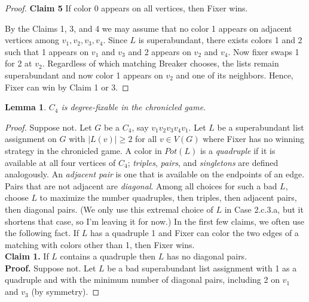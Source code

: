 \documentclass[12pt,reqno]{amsart}
\theoremstyle{plain}
\newtheorem{lem}[thm]{Lemma}
\theoremstyle{definition}
\theoremstyle{remark}
\newcommand{\card}[1]{\left|#1\right|}
\begin{document}
\begin{proof}
\noindent
\textbf{Claim 5}
If color 0 appears on all vertices, then Fixer wins.

By the Claims 1, 3, and 4 we may assume that no color 1 appears on adjacent
vertices among $v_1,v_2,v_3,v_4$.  Since $L$ is superabundant, there exists
colors 1 and 2 such that 1 appears on $v_1$ and $v_3$ and 2 appears on $v_2$
and $v_4$.  Now fixer swaps 1 for 2 at $v_2$.  Regardless of which matching
Breaker chooses, the lists remain superabundant and now color 1 appears on
$v_2$ and one of its neighbors.  Hence, Fixer can win by Claim 1 or 3.
\end{proof}


\begin{lem}\label{FixC4}
$C_4$ is degree-fixable in the chronicled game.
\end{lem}
\begin{proof}
Suppose not. Let $G$ be a $C_4$, say $v_1v_2v_3v_4v_1$.  Let $L$ be a superabundant list assignment on $G$ with $\card{L(v)} \ge 2$ for all $v \in V(G)$ where Fixer has no winning strategy in the chronicled game.
A color in $Pot(L)$ is a \emph{quadruple} if it is available at all four
vertices of $C_4$; \emph{triples}, \emph{pairs}, and \emph{singletons} are
defined analogously.  An \emph{adjacent pair} is one that is available on the
endpoints of an edge.  Pairs that are not adjacent are \emph{diagonal}.
Among all choices for such a bad $L$, choose $L$ to maximize the number
quadruples, then triples, then adjacent pairs, then diagonal pairs.
(We only use this extremal choice of $L$ in Case 2.c.3.a, but it shortens that
case, so I'm leaving it for now.)
In the first few claims, we often use the following fact.
If $L$ has a quadruple 1 and Fixer can color the two edges of a matching with
colors other than 1, then Fixer wins.\\
%

\noindent
\textbf{Claim 1.}
If $L$ contains a quadruple then $L$ has no
diagonal pairs.  \\
%
\textbf{Proof.}
Suppose not. Let $L$ be a bad superabundant list assignment with 1 as a
quadruple and with the minimum number of diagonal pairs, including 2 on $v_1$
and $v_3$ (by symmetry).


\end{proof}
\end{document}

